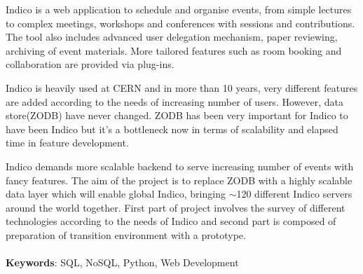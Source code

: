 


\begin{abstracts}        %

\par Indico is a web application to schedule and organise events, from simple lectures to complex meetings, workshops and conferences with sessions and contributions. The tool also includes advanced user delegation mechanism, paper reviewing, archiving of event materials. More tailored features such as room booking and collaboration are provided via plug-ins.
\\
\par Indico is heavily used at CERN and in more than 10 years, very different features are added according to the needs of increasing number of users. However, data store(ZODB) have never changed. ZODB has been very important for Indico to have been Indico but it's a bottleneck now in terms of scalability and elapsed time in feature development.
\\
\par Indico demands more scalable backend to serve increasing number of events with fancy features. The aim of the project is to replace ZODB with a highly scalable data layer which will enable global Indico, bringing $\sim$120 different Indico servers around the world together. First part of project involves the survey of different technologies according to the needs of Indico and second part is composed of preparation of transition environment with a prototype.
\\
\\
\textbf{Keywords}: SQL, NoSQL, Python, Web Development

\end{abstracts}



